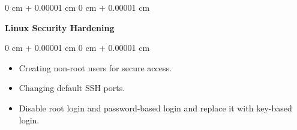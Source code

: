 \documentclass[10pt, letterpaper]{article}
\newenvironment{highlights}{
    \begin{itemize}[
        topsep=0.10 cm,
        parsep=0.10 cm,
        partopsep=0pt,
        itemsep=0pt,
        leftmargin=0 cm + 10pt
    ]
}{
    \end{itemize}
} %
\newenvironment{onecolentry}{
    \begin{adjustwidth}{
        0 cm + 0.00001 cm
    }{
        0 cm + 0.00001 cm
    }
}{
    \end{adjustwidth}
} %
\newenvironment{twocolentry}[2][]{
    \onecolentry
    \def\secondColumn{#2}
    \setcolumnwidth{\fill, 4.5 cm}
    \begin{paracol}{2}
}{
    \switchcolumn \raggedleft \secondColumn
    \end{paracol}
    \endonecolentry
} %
\begin{document}
        \vspace{0.2 cm}

        \begin{twocolentry}{
            
        }
            \textbf{Linux Security Hardening}\end{twocolentry}

        \vspace{0.10 cm}
        \begin{onecolentry}
            \begin{highlights}
                \item Creating non-root users for secure access.
                \item Changing default SSH ports.
                \item Disable root login and password-based login and replace it with key-based login.
            \end{highlights}
        \end{onecolentry}
\end{document}
